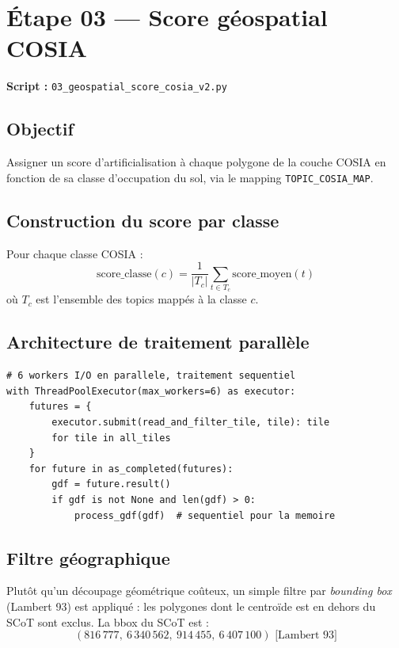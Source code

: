 \documentclass[12pt,a4paper]{report}
\newcommand{\code}[1]{\texttt{\small #1}}
\newcommand{\cosia}{\textsc{COSIA}}
\begin{document}
\section{Étape 03 — Score géospatial COSIA}

\textbf{Script :} \code{03\_geospatial\_score\_cosia\_v2.py}

\subsection{Objectif}

Assigner un score d'artificialisation à chaque polygone de la couche \cosia{} en fonction de sa classe d'occupation du sol, via le mapping \code{TOPIC\_COSIA\_MAP}.

\subsection{Construction du score par classe}

Pour chaque classe COSIA :
$$
\text{score\_classe}(c) = \frac{1}{|T_c|} \sum_{t \in T_c} \text{score\_moyen}(t)
$$
où $T_c$ est l'ensemble des topics mappés à la classe $c$.

\subsection{Architecture de traitement parallèle}

\begin{lstlisting}[language=Python3, caption={Lecture parallèle des tuiles COSIA}]
# 6 workers I/O en parallele, traitement sequentiel
with ThreadPoolExecutor(max_workers=6) as executor:
    futures = {
        executor.submit(read_and_filter_tile, tile): tile
        for tile in all_tiles
    }
    for future in as_completed(futures):
        gdf = future.result()
        if gdf is not None and len(gdf) > 0:
            process_gdf(gdf)  # sequentiel pour la memoire
\end{lstlisting}

\subsection{Filtre géographique}

Plutôt qu'un découpage géométrique coûteux, un simple filtre par \textit{bounding box} (Lambert 93) est appliqué : les polygones dont le centroïde est en dehors du SCoT sont exclus. La bbox du SCoT est :
$$
(816\,777,\ 6\,340\,562,\ 914\,455,\ 6\,407\,100) \text{ [Lambert 93]}
$$
\end{document}
